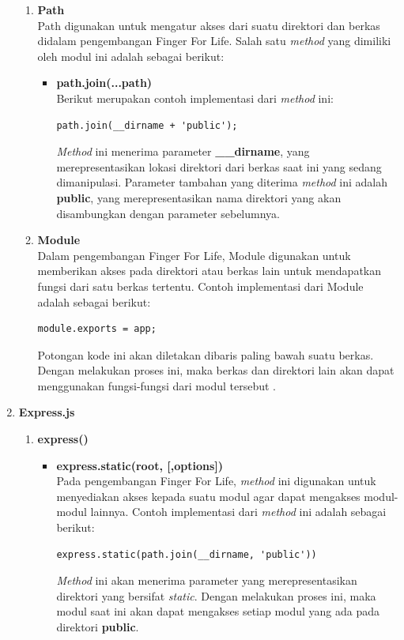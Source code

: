 \begin{enumerate}
\begin{enumerate}
		\item \textbf{Path} \\
		Path digunakan untuk mengatur akses dari suatu direktori dan berkas didalam pengembangan Finger For Life. Salah satu \textit{method} yang dimiliki oleh modul ini adalah sebagai berikut:
		
		\begin{itemize}
			\item \textbf{path.join(...path)} \\
			Berikut merupakan contoh implementasi dari \textit{method} ini:
\begin{lstlisting}[caption={contoh implementasi \textit{method join()}}]
path.join(__dirname + 'public');
\end{lstlisting} 
			
			\textit{Method} ini menerima parameter \textbf{\_\_dirname}, yang merepresentasikan lokasi direktori dari berkas saat ini yang sedang dimanipulasi. Parameter tambahan yang diterima \textit{method} ini adalah \textbf{public}, yang merepresentasikan nama direktori yang akan disambungkan dengan parameter sebelumnya.
		\end{itemize}
		
		
		\item \textbf{Module} \\
		Dalam pengembangan Finger For Life, Module digunakan untuk memberikan akses pada direktori atau berkas lain untuk mendapatkan fungsi dari satu berkas tertentu. Contoh implementasi dari Module adalah sebagai berikut:
\begin{lstlisting}[caption={proses \textit{export} suatu modul}]
module.exports = app;
\end{lstlisting}
Potongan kode ini akan diletakan dibaris paling bawah suatu berkas. Dengan melakukan proses ini, maka berkas dan direktori lain akan dapat menggunakan fungsi-fungsi dari modul tersebut .
	\end{enumerate}
	
	\item \textbf{Express.js} \\
	\begin{enumerate}
		\item \textbf{express()}
		\begin{itemize}
			\item \textbf{express.static(root, [,options])} \\
			Pada pengembangan Finger For Life, \textit{method} ini digunakan untuk menyediakan akses kepada suatu modul agar dapat mengakses modul-modul lainnya. Contoh implementasi dari \textit{method} ini adalah sebagai berikut:
\begin{lstlisting}
express.static(path.join(__dirname, 'public'))
\end{lstlisting}
			\textit{Method} ini akan menerima parameter yang merepresentasikan direktori yang bersifat \textit{static}. Dengan melakukan proses ini, maka modul saat ini akan dapat mengakses setiap modul yang ada pada direktori \textbf{public}.
			

\end{itemize}
\end{enumerate}
\end{enumerate}
